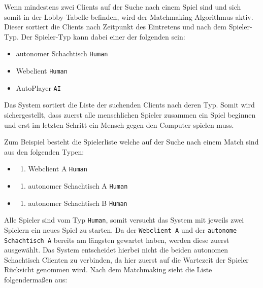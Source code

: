 Wenn mindestens zwei Clients auf der Suche nach einem Spiel sind und
sich somit in der Lobby-Tabelle befinden, wird der
Matchmaking-Algorithmus aktiv. Dieser sortiert die Clients nach
Zeitpunkt des Eintretens und nach dem Spieler-Typ. Der Spieler-Typ kann
dabei einer der folgenden sein:

\begin{itemize}
\tightlist
\item
  autonomer Schachtisch \passthrough{\lstinline!Human!}
\item
  Webclient \passthrough{\lstinline!Human!}
\item
  AutoPlayer \passthrough{\lstinline!AI!}
\end{itemize}

Das System sortiert die Liste der suchenden Clients nach deren Typ.
Somit wird sichergestellt, dass zuerst alle menschlichen Spieler
zusammen ein Spiel beginnen und erst im letzten Schritt ein Mensch gegen
den Computer spielen muss.

Zum Beispiel besteht die Spielerliste welche auf der Suche nach einem
Match sind aus den folgenden Typen:

\begin{itemize}
\item
  \begin{enumerate}
  \def\labelenumi{\arabic{enumi}.}
  \tightlist
  \item
    Webclient A \passthrough{\lstinline!Human!}
  \end{enumerate}
\item
  \begin{enumerate}
  \def\labelenumi{\arabic{enumi}.}
  \setcounter{enumi}{1}
  \tightlist
  \item
    autonomer Schachtisch A \passthrough{\lstinline!Human!}
  \end{enumerate}
\item
  \begin{enumerate}
  \def\labelenumi{\arabic{enumi}.}
  \setcounter{enumi}{2}
  \tightlist
  \item
    autonomer Schachtisch B \passthrough{\lstinline!Human!}
  \end{enumerate}
\end{itemize}

Alle Spieler sind vom Typ \passthrough{\lstinline!Human!}, somit
versucht das System mit jeweils zwei Spielern ein neues Spiel zu
starten. Da der \passthrough{\lstinline!Webclient A!} und der
\passthrough{\lstinline!autonome Schachtisch A!} bereits am längsten
gewartet haben, werden diese zuerst ausgewählt. Das System entscheidet
hierbei nicht die beiden autonomen Schachtisch Clienten zu verbinden, da
hier zuerst auf die Wartezeit der Spieler Rücksicht genommen wird. Nach
dem Matchmaking sieht die Liste folgendermaßen aus:

